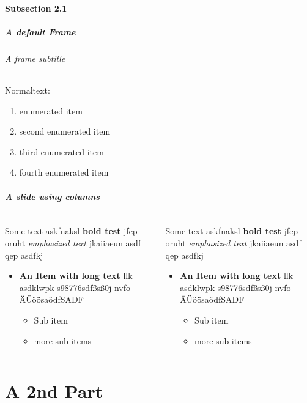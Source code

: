 \documentclass[german,aspectratio=169,notoc,titlestyle=white,structurestyle=white]{tudbeamer}%
\begin{document}
\subsection{Subsection 2.1}
\begin{frame}
	\frametitle{A default Frame}
	\framesubtitle{A frame subtitle}

	Normaltext:
	\begin{enumerate}
		\item enumerated item
		\item second enumerated item
		\item third enumerated item
		\item fourth enumerated item
	\end{enumerate}
\end{frame}
\begin{frame}
	\frametitle{A slide using columns}
	\begin{columns}
	   	\begin{column}{.5\textwidth}
	   		Some text askfnaksl \textbf{bold test} jfep oruht \emph{emphasized text} jkaiiaeun asdf qep  asdfkj  
	   		\begin{itemize}
	   			\item \textbf{An Item with long text} llk asdklwpk s98776sdfßsß0j nvfo ÄÜöösaödfSADF
	   			\begin{itemize}
	   				\item Sub item
	   				\item more sub items
	   			\end{itemize}
	   		\end{itemize}
		\end{column}
	   	\begin{column}{.5\textwidth}
	   		Some text askfnaksl \textbf{bold test} jfep oruht \emph{emphasized text} jkaiiaeun asdf qep  asdfkj  
	   		\begin{itemize}
	   			\item \textbf{An Item with long text} llk asdklwpk s98776sdfßsß0j nvfo ÄÜöösaödfSADF
	   			\begin{itemize}
	   				\item Sub item
	   				\item more sub items
	   			\end{itemize}
	   		\end{itemize}
		\end{column}
	\end{columns}
\end{frame}

\part{A 2nd Part}
\end{document}
